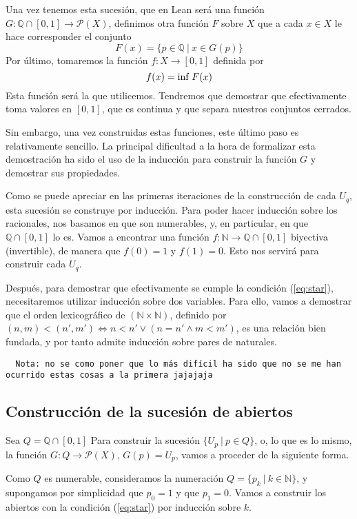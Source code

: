 Una vez tenemos esta sucesión, que en Lean será una función $G : \mathbb{Q}\cap[0, 1] \to \mathcal{P}(X)$, definimos otra función $F$ sobre $X$ que a cada $x \in X$ le hace corresponder el conjunto
$$
F(x) = \{p \in \mathbb{Q} ~|~ x \in G(p)\}
$$
Por último, tomaremos la función $f : X \to [0, 1]$ definida por
$$
f(x) = \textnormal{inf}~F(x)
$$
Esta función será la que utilicemos. Tendremos que demostrar que efectivamente toma valores en $[0, 1]$, que es continua y que separa nuestros conjuntos cerrados.

Sin embargo, una vez construidas estas funciones, este último paso es relativamente sencillo. La principal dificultad a la hora de formalizar esta demostración ha sido el uso de la inducción para construir la función $G$ y demostrar sus propiedades.

Como se puede apreciar en las primeras iteraciones de la construcción de cada $U_q$, esta sucesión se construye por inducción. Para poder hacer inducción sobre los racionales, nos basamos en que son numerables, y, en particular, en que $\mathbb{Q}\cap[0, 1]$ lo es. Vamos a encontrar una función $f : \mathbb{N} \to \mathbb{Q} \cap [0, 1]$ biyectiva (invertible), de manera que $f(0) = 1$ y $f(1) = 0$. Esto nos servirá para construir cada $U_q$.

Después, para demostrar que efectivamente se cumple la condición (\ref{eq:star}), necesitaremos utilizar inducción sobre dos variables. Para ello, vamos a demostrar que el orden lexicográfico de $(\mathbb{N} \times \mathbb{N})$, definido por $(n, m) < (n', m') \iff n<n' \lor (n=n' \land m<m')$, es una relación bien fundada, y por tanto admite inducción sobre pares de naturales.

\begin{lstlisting}
  Nota: no se como poner que lo más difícil ha sido que no se me han ocurrido estas cosas a la primera jajajaja
\end{lstlisting}

\subsection{Construcción de la sucesión de abiertos}

Sea $Q = \mathbb{Q}\cap[0, 1]$ Para construir la sucesión $\{U_p ~|~ p \in Q\}$, o, lo que es lo mismo, la función $G : Q \to \mathcal{P}(X)$, $G(p) = U_p$, vamos a proceder de la siguiente forma.

Como $Q$ es numerable, consideramos la numeración $Q = \{p_k ~|~ k \in \mathbb{N}\}$, y supongamos por simplicidad que $p_0 = 1$ y que $p_1 = 0$. Vamos a construir los abiertos con la condición (\ref{eq:star}) por inducción sobre $k$.

